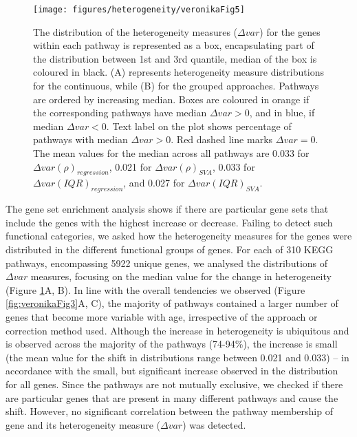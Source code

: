 \documentclass[12pt,twoside]{unicam}
\begin{document}
\begin{figure}

{\centering \texttt{[image: figures/heterogeneity/veronikaFig5]} 

}

\caption[Distributions of the heterogeneity measures obtained using a combination of continuous and grouped approaches with regression and SVA-correction for the individual pathways in KEGG database.]{The distribution of the heterogeneity measures ($\Delta var$) for the genes within each pathway is represented as a box, encapsulating part of the distribution between 1st and 3rd quantile, median of the box is coloured in black. (A) represents heterogeneity measure distributions for the continuous, while (B) for the grouped approaches. Pathways are ordered by increasing median. Boxes are coloured in orange if the corresponding pathways have median $\Delta var > 0$, and in blue, if median $\Delta var < 0$. Text label on the plot shows percentage of pathways with median $\Delta var > 0$. Red dashed line marks $\Delta var = 0$. The mean values for the median across all pathways are 0.033 for $\Delta var(\rho)_{regression}$, 0.021 for $\Delta var(\rho)_{SVA}$, 0.033 for $\Delta var(IQR)_{regression}$, and 0.027 for $\Delta var(IQR)_{SVA}$.}\label{fig:veronikaFig5}
\end{figure}

The gene set enrichment analysis shows if there are particular gene sets that include the genes with the highest increase or decrease. Failing to detect such functional categories, we asked how the heterogeneity measures for the genes were distributed in the different functional groups of genes. For each of 310 KEGG pathways, encompassing 5922 unique genes, we analysed the distributions of \(\Delta var\) measures, focusing on the median value for the change in heterogeneity (Figure \ref{fig:veronikaFig5}A, B). In line with the overall tendencies we observed (Figure \ref{fig:veronikaFig3}A, C), the majority of pathways contained a larger number of genes that become more variable with age, irrespective of the approach or correction method used. Although the increase in heterogeneity is ubiquitous and is observed across the majority of the pathways (74-94\%), the increase is small (the mean value for the shift in distributions range between 0.021 and 0.033) -- in accordance with the small, but significant increase observed in the distribution for all genes. Since the pathways are not mutually exclusive, we checked if there are particular genes that are present in many different pathways and cause the shift. However, no significant correlation between the pathway membership of gene and its heterogeneity measure (\(\Delta var\)) was detected.
\end{document}
